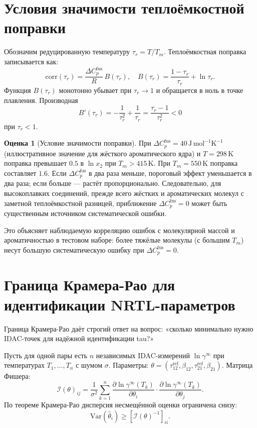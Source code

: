 \documentclass[11pt]{article}
\newcommand{\dCpfus}{\Delta C_p^{\mathrm{fus}}}
\theoremstyle{definition}
\newtheorem{estimate}{Оценка}[section]
\begin{document}
\section{Условия значимости теплоёмкостной поправки}
\label{app:dcp-significance}

Обозначим редуцированную температуру $\tau_r = T/T_m$. Теплоёмкостная поправка записывается как:
\begin{equation}
    \mathrm{corr}(\tau_r) = \frac{\dCpfus}{R} \, B(\tau_r),
    \quad
    B(\tau_r) = \frac{1-\tau_r}{\tau_r} + \ln\tau_r.
\end{equation}
Функция $B(\tau_r)$ монотонно убывает при $\tau_r \to 1$ и обращается в ноль в точке плавления. Производная
\begin{equation*}
    B'(\tau_r)=-\frac{1}{\tau_r^2}+\frac{1}{\tau_r}
    =\frac{\tau_r-1}{\tau_r^2}<0
\end{equation*}
при $\tau_r < 1$.

\begin{estimate}[Условие значимости поправки]
При $\dCpfus = 40\,\mathrm{J\,mol^{-1}K^{-1}}$ (иллюстративное значение для жёсткого ароматического ядра) и $T = 298\,\mathrm K$ поправка превышает $0.5$ в $\ln x_2$ при $T_m > 415\,\mathrm K$. При $T_m = 550\,\mathrm K$ поправка составляет $1.6$. Если $\dCpfus$ в два раза меньше, пороговый эффект уменьшается в два раза; если больше --- растёт пропорционально. Следовательно, для высокоплавких соединений, прежде всего жёстких и ароматических молекул с заметной теплоёмкостной разницей, приближение $\dCpfus = 0$ может быть существенным источником систематической ошибки.
\end{estimate}

Это объясняет наблюдаемую корреляцию ошибок с молекулярной массой и ароматичностью в тестовом наборе: более тяжёлые молекулы (с большим $T_m$) несут большую систематическую ошибку при $\dCpfus = 0$.

\section{Граница Крамера-Рао для идентификации NRTL-параметров}
\label{app:cramer-rao}

Граница Крамера-Рао даёт строгий ответ на вопрос: «сколько минимально нужно IDAC-точек для надёжной идентификации tau?»

Пусть для одной пары есть $n$ независимых IDAC-измерений $\ln\gamma^\infty$ при температурах $T_1, \ldots, T_n$ с шумом $\sigma$. Параметры: $\theta = (\tau_{12}^{\mathrm{ref}}, \beta_{12}, \tau_{21}^{\mathrm{ref}}, \beta_{21})$. Матрица Фишера:
\begin{equation}
    \mathcal{I}(\theta)_{ij} = \frac{1}{\sigma^2} \sum_{k=1}^n \frac{\partial \ln\gamma^\infty(T_k)}{\partial \theta_i} \cdot \frac{\partial \ln\gamma^\infty(T_k)}{\partial \theta_j}.
\end{equation}
По теореме Крамера-Рао дисперсия несмещённой оценки ограничена снизу:
\begin{equation}
    \mathrm{Var}(\hat{\theta}_i) \ge [\mathcal{I}(\theta)^{-1}]_{ii}.
\end{equation}
\end{document}
